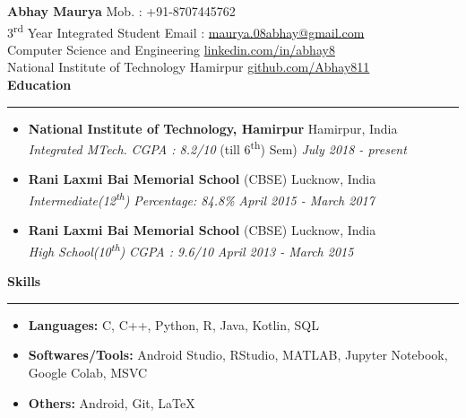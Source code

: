 \documentclass[11pt]{article}
\begin{document}
   
    \textbf{\LARGE{Abhay Maurya}}
    \hfill
        Mob. : +91-8707445762
    \\
    3\textsuperscript{rd} Year Integrated Student
    \hfill
        Email : \href{mailto:maurya.08abhay@gmail.com}{maurya.08abhay@gmail.com}\\
    \hfill
        Computer Science and Engineering
    \hfill
        \href{https://www.linkedin.com/in/abhay8/}{linkedin.com/in/abhay8}\\
    \hfill
    National Institute of Technology Hamirpur
    \hfill
     \href{https://github.com/Abhay811}{github.com/Abhay811}\\

\textbf{\large{Education}}
    \vspace{3pt}
   \hrule
    \begin{itemize}
    \setlength{\itemsep}{4pt}
        \setlength{\parskip}{0pt}
        \setlength{\parsep}{4pt}
        \item \textbf{National Institute of Technology, Hamirpur} \hfill Hamirpur, India\\
        \textsl{Integrated MTech.} \textit{CGPA : 8.2/10}  (till 6\textsuperscript{th}) Sem)
        \hfill 
        \textit{July 2018 - present}
        \item \textbf{Rani Laxmi Bai Memorial School} (CBSE) \hfill Lucknow, India\\
        \textsl{Intermediate(12\textsuperscript{th}) } \textit{Percentage: 84.8\%}  \hfill 
        \textit{April 2015 - March 2017}
        \item \textbf{Rani Laxmi Bai Memorial School} (CBSE) \hfill
        Lucknow, India\\
        \textsl{High School(10\textsuperscript{th})} \textit{CGPA : 9.6/10}
        \hfill \textit{April 2013 - March 2015}
    \end{itemize}
    
    \textbf{\large{Skills}}
    \vspace{3pt}
    \hrule
    \begin{itemize}
        \setlength{\itemsep}{0pt}
        \setlength{\parskip}{0pt}
        \setlength{\parsep}{0pt}
        \item \textbf{Languages:} C, C++, Python, R, Java, Kotlin, SQL
        \item \textbf{Softwares/Tools:} Android Studio, RStudio, MATLAB, Jupyter Notebook, Google Colab, MSVC
        \item \textbf{Others:} Android, Git, \LaTeX
    \end{itemize}
    
\end{document}
